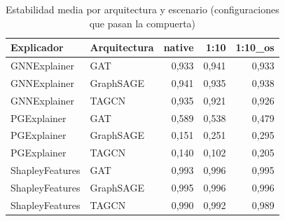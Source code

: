 \begin{table}[htbp]
\centering\small
\caption{Estabilidad media por arquitectura y escenario (configuraciones que pasan la compuerta)}
\label{tab:v4-estab-escenario}
\begin{tabular}{llrrr}
\toprule
Explicador & Arquitectura & native & 1:10 & 1:10\_os \\
\midrule
GNNExplainer & GAT & 0,933 & 0,941 & 0,933 \\
GNNExplainer & GraphSAGE & 0,941 & 0,935 & 0,938 \\
GNNExplainer & TAGCN & 0,935 & 0,921 & 0,926 \\
PGExplainer & GAT & 0,589 & 0,538 & 0,479 \\
PGExplainer & GraphSAGE & 0,151 & 0,251 & 0,295 \\
PGExplainer & TAGCN & 0,140 & 0,102 & 0,205 \\
ShapleyFeatures & GAT & 0,993 & 0,996 & 0,995 \\
ShapleyFeatures & GraphSAGE & 0,995 & 0,996 & 0,996 \\
ShapleyFeatures & TAGCN & 0,990 & 0,992 & 0,989 \\
\bottomrule
\end{tabular}
\end{table}

